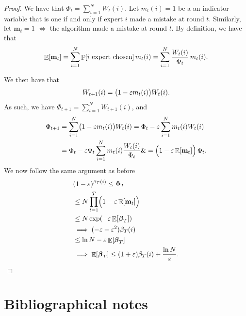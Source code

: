 \begin{proof}
    We have that $\Phi_{t} = \sum_{i=1}^N W_t(i)$. Let $m_t(i)=1$ be a
    an indicator variable that is one if and only if expert $i$ made a
    mistake at round $t$. Similarly, let $\textbf{m}_t=1$ $\iff$ the
    algorithm made a mistake at round $t$. By definition, we have that
    \begin{equation*}
        \Ex{\textbf{m}_t}%
        =%
        \sum_{i=1}^N \Prob{ i \text{ expert chosen}} \, m_t(i)
        =%
        \sum_{i=1}^N \frac{W_t(i)}{\Phi_t} \, m_t(i).
    \end{equation*}



    We then have that
    \begin{equation*}
        W_{t+1}(i) = \bigl(1-{\varepsilon} m_t(i) \bigr)W_t(i).        
    \end{equation*}
    As such, we have
    $\Phi_{t+1}%
        =%
        \sum_{i=1}^N W_{t+1}(i)$, and 
    \begin{align*}
        \Phi_{t+1}%
        &=%
        \sum_{i=1}^N \bigl(1-\eps m_t(i) \bigr)W_t(i)        
        =%
        \Phi_{t} -\eps 
        \sum_{i=1}^N  m_t(i)W_t(i)
        \\&=%
        \Phi_{t} -\eps \Phi_t
        \sum_{i=1}^N  m_t(i)\frac{W_t(i)}{\Phi_t}
        \&=%
        \Bigl( 1-\eps \Ex{\textbf{m}_t}\Bigr) \, \Phi_t.
    \end{align*}
    We now follow the same argument as before
    \begin{align*}
      &(1-\eps)^{\mistakesY{T}{i}} \leq \Phi_T
      \\&\leq %
        N \prod_{t=1}^T \Bigl( 1-\eps \Ex{\textbf{m}_t}\Bigr)
      \\&\leq %
        N  \exp\pth{ -\eps \Ex{ \MistakesX{T}} }
      \\&\implies%
        (-\eps - \eps^2 ) \mistakesY{T}{i}
      \\&\leq
        \ln N  -\eps \Ex{ \MistakesX{T}} 
      \\%
      &\implies%
        \Ex{ \MistakesX{T} } 
        \leq
        (1 + \eps ) \mistakesY{T}{i} + \frac{\ln N}{\eps}.
    \end{align*}

\end{proof}


\section{Bibliographical notes} 



